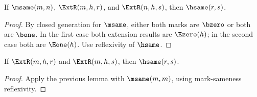\begin{lemma}
If \(\msame(m,n)\), \(\ExtR(m,h,r)\), and \(\ExtR(n,h,s)\), then \(\hsame(r,s)\).
\end{lemma}
\begin{proof}
By closed generation for \(\msame\), either both marks are \(\bzero\) or both are \(\bone\). In the first case both extension results are \(\Ezero(h)\); in the second case both are \(\Eone(h)\). Use reflexivity of \(\hsame\).
\end{proof}

\begin{theorem}
If \(\ExtR(m,h,r)\) and \(\ExtR(m,h,s)\), then \(\hsame(r,s)\).
\end{theorem}
\begin{proof}
Apply the previous lemma with \(\msame(m,m)\), using mark-sameness reflexivity.
\end{proof}



